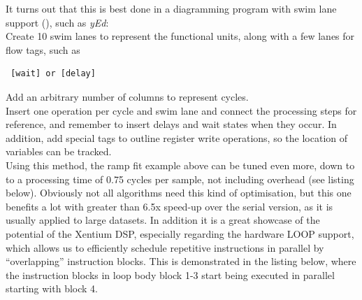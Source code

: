 \noindent
It turns out that this is best done in a diagramming program with swim lane
support (), such as \emph{yEd}: \\

\noindent
Create 10 swim lanes to represent the functional units, along with a few lanes
for flow tags, such as

\begin{lstlisting}
 [wait] or [delay]
\end{lstlisting}

\noindent
Add an arbitrary number of columns to represent cycles. \\

\noindent
Insert one operation per cycle and swim lane and connect the processing steps
for reference, and remember to insert delays and wait states when they occur.
In addition, add special tags to outline register write operations, so the
location of variables can be tracked. \\

\noindent
Using this method, the ramp fit example above can be tuned even more, down to
to a processing time of 0.75 cycles per sample, not including overhead (see
listing below). Obviously not all algorithms need this kind of
optimisation, but this one benefits a lot with greater than 6.5x speed-up over
the serial version, as it is usually applied to large datasets. In addition it
is a great showcase of the potential of the Xentium DSP, especially regarding
the hardware LOOP support, which allows us to efficiently schedule repetitive
instructions in parallel by “overlapping” instruction blocks. This is
demonstrated in the listing below, where the instruction blocks in loop body
block 1-3 start being executed in parallel starting with block 4. \\\\


